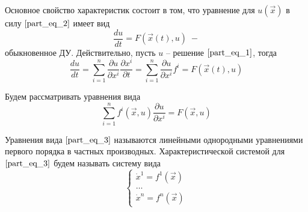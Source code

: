 Основное свойство характеристик состоит в том, что уравнение для $u \left( \overrightarrow{x} \right) $ в силу $\eqref{part_eq_2}$ имеет вид 
\begin{equation*}
    \frac{du}{dt} = F \left( \overrightarrow{x} \left( t \right) , u \right) \; -
\end{equation*}
обыкновенное ДУ. Действительно, пусть $u$ -- решение $\eqref{part_eq_1}$, тогда 
\begin{equation*}
    \frac{du}{dt} = \sum \limits_{i = 1}^{n} \frac{\partial u}{\partial x^i} \frac{\partial x^i}{\partial t} = \sum \limits_{i = 1}^{n} \frac{\partial u}{\partial x^i} f^i = F \left( \overrightarrow{x} \left( t \right) , u \right) 
\end{equation*}

Будем рассматривать уравнения вида
\begin{equation}
    \sum \limits_{i = 1}^{n} f^{i} \left( \overrightarrow{x}, u \right) \frac{\partial u}{\partial x^{i}} = F \left( \overrightarrow{x}, u \right) 
    \label{part_eq_3}
\end{equation}

\begin{definition}
    Уравнения вида $\eqref{part_eq_3}$ называются линейными однородными уравнениями первого порядка в частных производных. Характеристической системой для $\eqref{part_eq_3}$ будем называть систему вида
    \begin{equation}
        \begin{cases}
            \dot{x}^1 = f^1 \left( \overrightarrow{x} \right) \\
            \dots                                             \\
            \dot{x}^n = f^n \left( \overrightarrow{x} \right) 
        \end{cases}
        \label{part_eq_4}
    \end{equation}
\end{definition}

